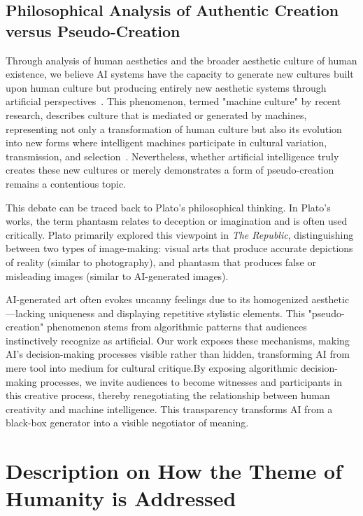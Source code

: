 \documentclass{article}
\begin{document}
\subsection{Philosophical Analysis of Authentic Creation versus Pseudo-Creation}

Through analysis of human aesthetics and the broader aesthetic culture of human existence, we believe AI systems have the capacity to generate new cultures built upon human culture but producing entirely new aesthetic systems through artificial perspectives~\cite{brinkmann2023machine}. This phenomenon, termed "machine culture" by recent research, describes culture that is mediated or generated by machines, representing not only a transformation of human culture but also its evolution into new forms where intelligent machines participate in cultural variation, transmission, and selection~\cite{brinkmann2023machine}. Nevertheless, whether artificial intelligence truly creates these new cultures or merely demonstrates a form of pseudo-creation remains a contentious topic.

This debate can be traced back to Plato's philosophical thinking. In Plato's works, the term phantasm relates to deception or imagination and is often used critically. Plato primarily explored this viewpoint in \textit{The Republic}, distinguishing between two types of image-making: visual arts that produce accurate depictions of reality (similar to photography), and phantasm that produces false or misleading images (similar to AI-generated images).

AI-generated art often evokes uncanny feelings due to its homogenized aesthetic—lacking uniqueness and displaying repetitive stylistic elements. This "pseudo-creation" phenomenon stems from algorithmic patterns that audiences instinctively recognize as artificial. Our work exposes these mechanisms, making AI's decision-making processes visible rather than hidden, transforming AI from mere tool into medium for cultural critique.By exposing algorithmic decision-making processes, we invite audiences to become witnesses and participants in this creative process, thereby renegotiating the relationship between human creativity and machine intelligence. This transparency transforms AI from a black-box generator into a visible negotiator of meaning.

\section{Description on How the Theme of Humanity is Addressed}
\end{document}
